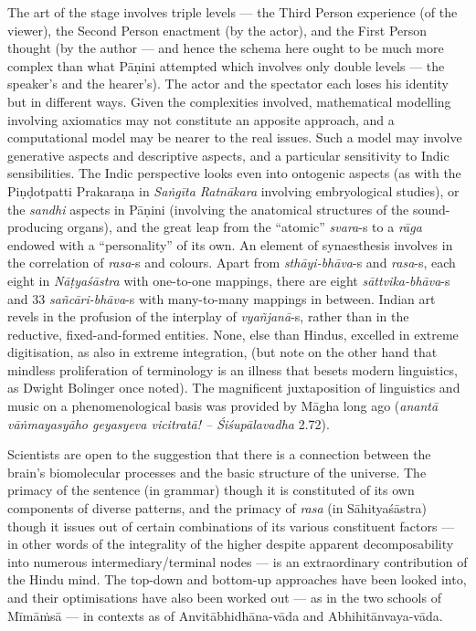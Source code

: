 The art of the stage involves triple levels --- the Third Person experience (of the viewer), the Second Person enactment (by the actor), and the First Person thought (by the author --- and hence the schema here ought to be much more complex than what Pāṇini attempted which involves only double levels --- the speaker’s and the hearer’s). The actor and the spectator each loses his identity but in different ways. Given the complexities involved, mathematical modelling involving axiomatics may not constitute an apposite approach, and a computational  model may be nearer to the real issues. Such a model may involve generative aspects and descriptive aspects, and a particular sensitivity to Indic sensibilities. The Indic perspective looks even into ontogenic aspects (as with the Piṇḍotpatti Prakaraṇa in \textsl{Saṅgīta Ratnākara} involving embryological studies), or the \textsl{sandhi} aspects in Pāṇini (involving the anatomical structures of the sound-producing organs), and the great leap from the “atomic” \textsl{svara}-s to a \textsl{rāga} endowed with a “personality” of its own. An element of synaesthesis involves in the correlation of \textsl{rasa}-s and colours. Apart from \textsl{sthāyi-bhāva}-s and \textsl{rasa}-s, each eight in \textsl{Nāṭyaśāstra} with one-to-one mappings, there are eight \textsl{sāttvika-bhāva}-s and 33 \textsl{sañcāri-bhāva}-s with many-to-many mappings in between. Indian art revels in the profusion of the interplay of \textsl{vyañjanā}-s, rather than in the reductive, fixed-and-formed entities. None, else than Hindus, excelled in extreme digitisation, as also in extreme integration, (but note on the other hand that mindless proliferation of terminology is an illness that besets modern linguistics, as Dwight Bolinger once noted). The magnificent juxtaposition of linguistics and music on a phenomenological basis was provided by Māgha long ago (\textsl{anantā vāṅmayasyāho geyasyeva vicitratā! -- Śiśupālavadha} 2.72).
 
Scientists are open to the suggestion that there is a connection between the brain's biomolecular processes and the basic structure of the universe. The primacy of the sentence (in grammar) though it is constituted of its own components of diverse patterns, and the primacy of \textsl{rasa} (in Sāhityaśāstra) though it issues out of certain combinations of its various constituent factors --- in other words of the integrality of the higher despite apparent decomposability into numerous intermediary/terminal nodes --- is an extraordinary contribution of the Hindu mind. The top-down and bottom-up approaches have been looked into, and their optimisations have also been worked out --- as in the two schools of Mīmāṁsā --- in contexts as of Anvitābhidhāna-vāda and Abhihitānvaya-vāda.

